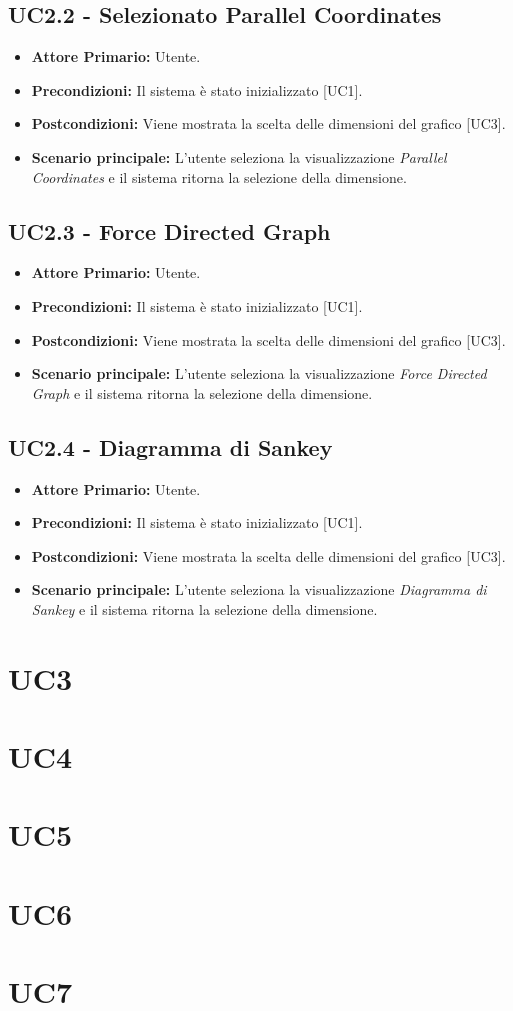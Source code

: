  \subsection{UC2.2 - Selezionato Parallel Coordinates}
 \begin{itemize}
    \item \textbf{Attore Primario:} Utente.
    \item \textbf{Precondizioni:} Il sistema è stato inizializzato [UC1].
    \item \textbf{Postcondizioni:} Viene mostrata la scelta delle dimensioni del grafico [UC3].
    \item \textbf{Scenario principale:} L'utente seleziona la visualizzazione \textit{Parallel Coordinates} e il sistema ritorna la selezione della dimensione.
\end{itemize}
 \subsection{UC2.3 - Force Directed Graph}
 \begin{itemize}
    \item \textbf{Attore Primario:} Utente.
    \item \textbf{Precondizioni:} Il sistema è stato inizializzato [UC1].
    \item \textbf{Postcondizioni:} Viene mostrata la scelta delle dimensioni del grafico [UC3].
    \item \textbf{Scenario principale:} L'utente seleziona la visualizzazione \textit{Force Directed Graph} e il sistema ritorna la selezione della dimensione.
\end{itemize}
 \subsection{UC2.4 - Diagramma di Sankey}
 \begin{itemize}
    \item \textbf{Attore Primario:} Utente.
    \item \textbf{Precondizioni:} Il sistema è stato inizializzato [UC1].
    \item \textbf{Postcondizioni:} Viene mostrata la scelta delle dimensioni del grafico [UC3].
    \item \textbf{Scenario principale:} L'utente seleziona la visualizzazione \textit{Diagramma di Sankey} e il sistema ritorna la selezione della dimensione.
\end{itemize}

\section{UC3}

\section{UC4}

\section{UC5}

\section{UC6}

\section{UC7}